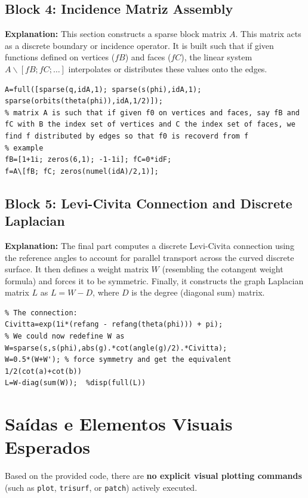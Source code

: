 \subsection*{Block 4: Incidence Matriz Assembly}
\textbf{Explanation:} This section constructs a sparse block matrix $A$. This matrix acts as a discrete boundary or incidence operator. It is built such that if given functions defined on vertices ($fB$) and faces ($fC$), the linear system $A \backslash [fB; fC; \dots]$ interpolates or distributes these values onto the edges. 
\begin{lstlisting}
A=full([sparse(q,idA,1); sparse(s(phi),idA,1); sparse(orbits(theta(phi)),idA,1/2)]);
% matrix A is such that if given f0 on vertices and faces, say fB and fC with B the index set of vertices and C the index set of faces, we find f distributed by edges so that f0 is recoverd from f
% example 
fB=[1+1i; zeros(6,1); -1-1i]; fC=0*idF;
f=A\[fB; fC; zeros(numel(idA)/2,1)];
\end{lstlisting}

\subsection*{Block 5:   Levi-Civita Connection and Discrete Laplacian}
\textbf{Explanation:} The final part computes a discrete Levi-Civita connection using the reference angles to account for parallel transport across the curved discrete surface. It then defines a weight matrix $W$ (resembling the cotangent weight formula) and forces it to be symmetric. Finally, it constructs the graph Laplacian matrix $L$ as $L = W - D$, where $D$ is the degree (diagonal sum) matrix.
\begin{lstlisting}
% The connection:
Civitta=exp(1i*(refang - refang(theta(phi))) + pi);
% We could now redefine W as
W=sparse(s,s(phi),abs(g).*cot(angle(g)/2).*Civitta);
W=0.5*(W+W'); % force symmetry and get the equivalent 1/2(cot(a)+cot(b))
L=W-diag(sum(W));  %disp(full(L))
\end{lstlisting}

\section*{Saídas e Elementos Visuais Esperados}

Based on the provided code, there are \textbf{no explicit visual plotting commands} (such as \texttt{plot}, \texttt{trisurf}, or \texttt{patch}) actively executed. 

